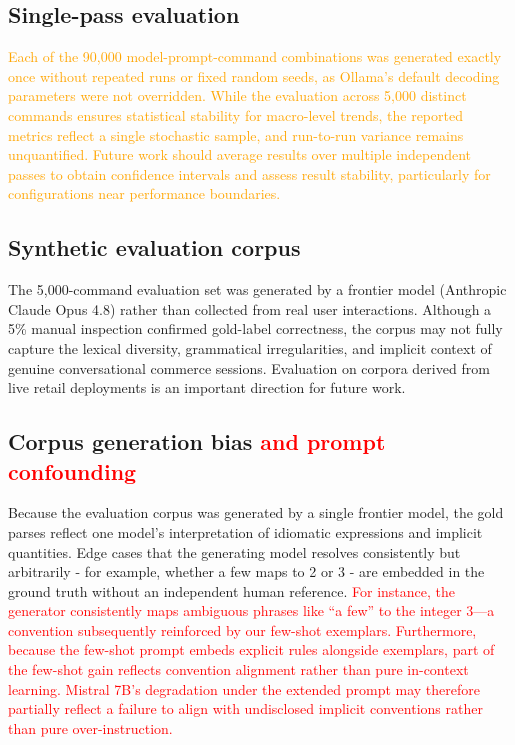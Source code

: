 \documentclass[journal,article,submit,pdftex,moreauthors]{Definitions/mdpi}
\begin{document}
\subsection{Single-pass evaluation}
\textcolor{orange}{Each of the 90,000 model-prompt-command combinations was generated exactly once without repeated runs or fixed random seeds, as Ollama's default decoding parameters were not overridden. While the evaluation across 5,000 distinct commands ensures statistical stability for macro-level trends, the reported metrics reflect a single stochastic sample, and run-to-run variance remains unquantified. Future work should average results over multiple independent passes to obtain confidence intervals and assess result stability, particularly for configurations near performance boundaries.}

\subsection{Synthetic evaluation corpus}
The 5,000-command evaluation set was generated by a frontier model (Anthropic Claude Opus 4.8) rather than collected from real user interactions. Although a 5\% manual inspection confirmed gold-label correctness, the corpus may not fully capture the lexical diversity, grammatical irregularities, and implicit context of genuine conversational commerce sessions. Evaluation on corpora derived from live retail deployments is an important direction for future work.

\subsection{Corpus generation bias \textcolor{red}{and prompt confounding}}
Because the evaluation corpus was generated by a single frontier model, the gold parses reflect one model's interpretation of idiomatic expressions and implicit quantities. Edge cases that the generating model resolves consistently but arbitrarily - for example, whether a few maps to 2 or 3 - are embedded in the ground truth without an independent human reference. \textcolor{red}{For instance, the generator consistently maps ambiguous phrases like ``a few'' to the integer 3—a convention subsequently reinforced by our few-shot exemplars. Furthermore, because the few-shot prompt embeds explicit rules alongside exemplars, part of the few-shot gain reflects convention alignment rather than pure in-context learning. Mistral 7B's degradation under the extended prompt may therefore partially reflect a failure to align with undisclosed implicit conventions rather than pure over-instruction.}
\end{document}
